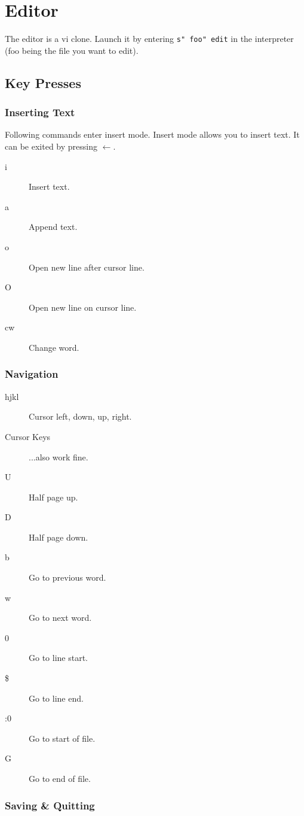 \chapter{Editor}

The editor is a vi clone. Launch it by entering \texttt{s" foo" edit} in the interpreter (foo being the file you want to edit).

\section{Key Presses}

\subsection{Inserting Text}
Following commands enter insert mode. Insert mode allows you to insert text. It can be exited by pressing $\leftarrow$.
\begin{description}
\item[i] Insert text.
\item[a] Append text.
\item[o] Open new line after cursor line.
\item[O] Open new line on cursor line.
\item[cw] Change word.
\end{description}

\subsection{Navigation}
\begin{description}
\item[hjkl] Cursor left, down, up, right.
\item[Cursor Keys] ...also work fine.
\item[U] Half page up.
\item[D] Half page down.
\item[b] Go to previous word.
\item[w] Go to next word.
\item[0] Go to line start.
\item[\$] Go to line end.
\item[:0] Go to start of file.
\item[G] Go to end of file.
\end{description}

\subsection{Saving \& Quitting}

